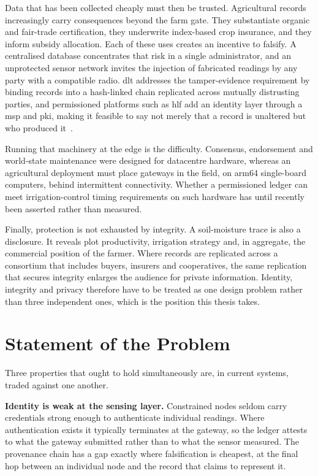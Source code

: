 \documentclass[12pt,a4paper,oneside]{book}
\begin{document}
Data that has been collected cheaply must then be trusted. Agricultural records
increasingly carry consequences beyond the farm gate. They substantiate organic
and fair-trade certification, they underwrite index-based crop insurance, and
they inform subsidy allocation. Each of these uses creates an incentive to
falsify. A centralised database concentrates that risk in a single
administrator, and an unprotected sensor network invites the injection of
fabricated readings by any party with a compatible radio. \gls{dlt} addresses
the tamper-evidence requirement by binding records into a hash-linked chain
replicated across mutually distrusting parties, and permissioned platforms such
as \gls{hlf} add an identity layer through a \gls{msp} and \gls{pki}, making it
feasible to say not merely that a record is unaltered but who produced
it~\cite{tar2023fabric, jayaram2023hyperledger, dube2024fabricIrrigation}.

Running that machinery at the edge is the difficulty. Consensus, endorsement and
world-state maintenance were designed for datacentre hardware, whereas an
agricultural deployment must place gateways in the field, on \gls{arm64}
single-board computers, behind intermittent connectivity. Whether a permissioned
ledger can meet irrigation-control timing requirements on such hardware has
until recently been asserted rather than measured.

Finally, protection is not exhausted by integrity. A soil-moisture trace is also
a disclosure. It reveals plot productivity, irrigation strategy and, in
aggregate, the commercial position of the farmer. Where records are replicated
across a consortium that includes buyers, insurers and cooperatives, the same
replication that secures integrity enlarges the audience for private
information. Identity, integrity and privacy therefore have to be treated as one
design problem rather than three independent ones, which is the position this
thesis takes.

\section{Statement of the Problem}
\label{sec:problem}

Three properties that ought to hold simultaneously are, in current systems,
traded against one another.

\textbf{Identity is weak at the sensing layer.} Constrained nodes seldom carry
credentials strong enough to authenticate individual readings. Where
authentication exists it typically terminates at the gateway, so the ledger
attests to what the gateway submitted rather than to what the sensor measured.
The provenance chain has a gap exactly where falsification is cheapest, at the
final hop between an individual node and the record that claims to represent
it.
\end{document}
